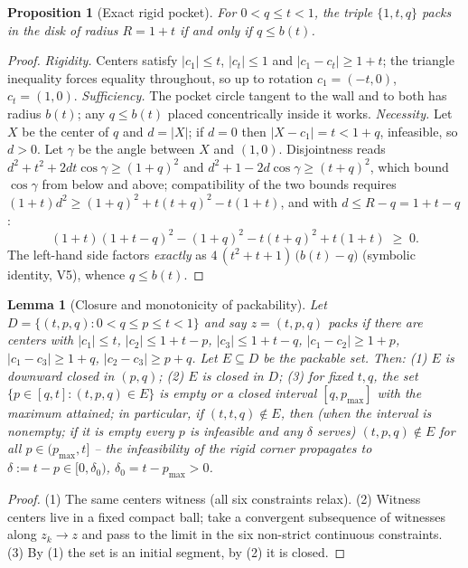 \documentclass[11pt]{article}
\newtheorem{lemma}[theorem]{Lemma}
\newtheorem{proposition}[theorem]{Proposition}
\theoremstyle{definition}
\begin{document}
\begin{proposition}[Exact rigid pocket]\label{prop:S5}
For $0<q\le t<1$, the triple $\{1,t,q\}$ packs in the disk of radius
$R=1+t$ if and only if $q\le b(t)$.
\end{proposition}
\begin{proof}
\emph{Rigidity.} Centers satisfy $|c_1|\le t$, $|c_t|\le1$ and
$|c_1-c_t|\ge1+t$; the triangle inequality forces equality throughout, so
up to rotation $c_1=(-t,0)$, $c_t=(1,0)$.
\emph{Sufficiency.} The pocket circle tangent to the wall and to both has
radius $b(t)$; any $q\le b(t)$ placed concentrically inside it works.
\emph{Necessity.} Let $X$ be the center of $q$ and $d=|X|$; if $d=0$ then
$|X-c_1|=t<1+q$, infeasible, so $d>0$. Let $\gamma$ be the
angle between $X$ and $(1,0)$. Disjointness reads
$d^2+t^2+2dt\cos\gamma\ge(1+q)^2$ and $d^2+1-2d\cos\gamma\ge(t+q)^2$, which
bound $\cos\gamma$ from below and above; compatibility of the two bounds
requires $(1+t)d^2\ge(1+q)^2+t(t+q)^2-t(1+t)$, and with $d\le R-q=1+t-q$:
\[
(1+t)(1+t-q)^2-(1+q)^2-t(t+q)^2+t(1+t)\;\ge\;0.
\]
The left-hand side factors \emph{exactly} as
$4\,(t^2+t+1)\,\bigl(b(t)-q\bigr)$ (symbolic identity, V5), whence
$q\le b(t)$.
\end{proof}

\begin{lemma}[Closure and monotonicity of packability]\label{lem:S6a}
Let $D=\{(t,p,q):0<q\le p\le t<1\}$ and say $z=(t,p,q)$ \emph{packs} if
there are centers with $|c_1|\le t$, $|c_2|\le1+t-p$, $|c_3|\le1+t-q$,
$|c_1-c_2|\ge1+p$, $|c_1-c_3|\ge1+q$, $|c_2-c_3|\ge p+q$. Let
$E\subseteq D$ be the packable set. Then:
\textup{(1)} $E$ is downward closed in $(p,q)$;
\textup{(2)} $E$ is closed in $D$;
\textup{(3)} for fixed $t,q$, the set $\{p\in[q,t]:(t,p,q)\in E\}$ is empty
or a closed interval $[q,p_{\max}]$ with the maximum attained; in
particular, if $(t,t,q)\notin E$, then (when the interval is nonempty;
if it is empty every $p$ is infeasible and any $\delta$ serves)
$(t,p,q)\notin E$ for all
$p\in(p_{\max},t]$ -- the infeasibility of the rigid corner propagates to
$\delta:=t-p\in[0,\delta_0)$, $\delta_0=t-p_{\max}>0$.
\end{lemma}
\begin{proof}
(1) The same centers witness (all six constraints relax). (2) Witness
centers live in a fixed compact ball; take a convergent subsequence of
witnesses along $z_k\to z$ and pass to the limit in the six non-strict
continuous constraints. (3) By (1) the set is an initial segment, by (2) it
is closed.
\end{proof}
\end{document}
